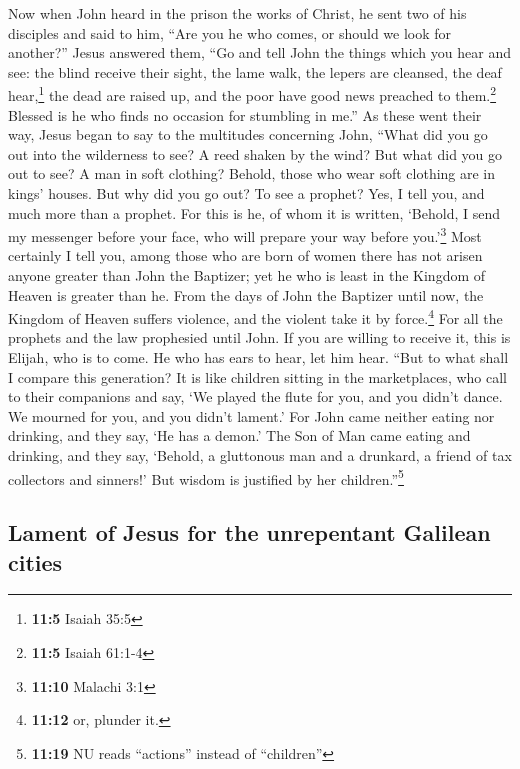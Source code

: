  Now when John heard in the prison the works of Christ, he
sent two of his disciples  and said to him, ``Are you he
who comes, or should we look for another?''  Jesus
answered them, ``Go and tell John the things which you hear and see:
 the blind receive their sight, the lame walk, the lepers
are cleansed, the deaf hear,\footnote{\textbf{11:5} Isaiah 35:5} the
dead are raised up, and the poor have good news preached to
them.\footnote{\textbf{11:5} Isaiah 61:1-4}  Blessed is he
who finds no occasion for stumbling in me.''  As these
went their way, Jesus began to say to the multitudes concerning John,
``What did you go out into the wilderness to see? A reed shaken by the
wind?  But what did you go out to see? A man in soft
clothing? Behold, those who wear soft clothing are in kings' houses.
 But why did you go out? To see a prophet? Yes, I tell
you, and much more than a prophet.  For this is he, of
whom it is written, `Behold, I send my messenger before your face, who
will prepare your way before you.'\footnote{\textbf{11:10} Malachi 3:1}
 Most certainly I tell you, among those who are born of
women there has not arisen anyone greater than John the Baptizer; yet he
who is least in the Kingdom of Heaven is greater than he.
 From the days of John the Baptizer until now, the
Kingdom of Heaven suffers violence, and the violent take it by
force.\footnote{\textbf{11:12} or, plunder it.}  For all
the prophets and the law prophesied until John.  If you
are willing to receive it, this is Elijah, who is to come.
 He who has ears to hear, let him hear. 
``But to what shall I compare this generation? It is like children
sitting in the marketplaces, who call to their companions
 and say, `We played the flute for you, and you didn't
dance. We mourned for you, and you didn't lament.'  For
John came neither eating nor drinking, and they say, `He has a demon.'
 The Son of Man came eating and drinking, and they say,
`Behold, a gluttonous man and a drunkard, a friend of tax collectors and
sinners!' But wisdom is justified by her children.''\footnote{\textbf{11:19}
  NU reads ``actions'' instead of ``children''}

\hypertarget{lament-of-jesus-for-the-unrepentant-galilean-cities}{%
\subsection{Lament of Jesus for the unrepentant Galilean
cities}\label{lament-of-jesus-for-the-unrepentant-galilean-cities}}

